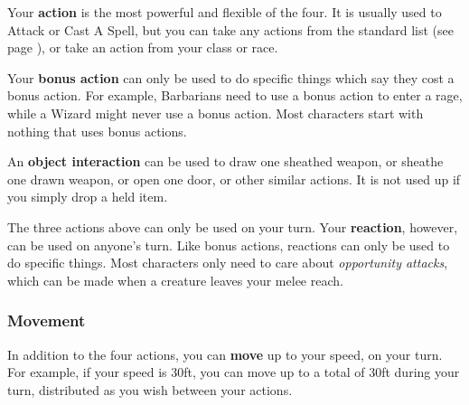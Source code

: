 \documentclass[letterpaper,twocolumn,openany,nodeprecatedcode,bg=print]{dndbook}
\newcommand{\pg}[1]{page \pageref{#1}}
\newcommand{\see}[1]{(see \pg{#1})}
\begin{document}
Your \textbf{action} is the most powerful and flexible of the four. 
It is usually used to Attack or Cast A Spell, but you can take any actions from the standard list \see{combat-options}, 
or take an action from your class or race.

Your \textbf{bonus action} can only be used to do specific things which say they cost a bonus action. 
For example, Barbarians need to use a bonus action to enter a rage, while a Wizard might never use a bonus action. 
Most characters start with nothing that uses bonus actions.

An \textbf{object interaction} can be used to 
draw one sheathed weapon, or sheathe one drawn weapon, or open one door, or other similar actions. 
It is not used up if you simply drop a held item.

The three actions above can only be used on your turn. 
Your \textbf{reaction}, however, can be used on anyone's turn. 
Like bonus actions, reactions can only be used to do specific things. 
Most characters only need to care about \textit{opportunity attacks}, which can be made when a creature leaves your melee reach.

\subsubsection{Movement}

In addition to the four actions, you can \textbf{move} up to your speed, on your turn. 
For example, if your speed is 30ft, you can move up to a total of 30ft during your turn, distributed as you wish between your actions.
\end{document}
